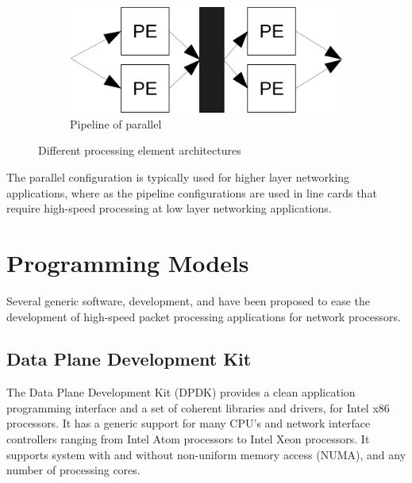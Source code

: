 \begin{figure}
  \begin{subfigure}[b]{0.475\textwidth}
    \centering
    \includegraphics[scale=.5]{images/pipeline-parallel.pdf}
    \caption[]%
    {{\small Pipeline of parallel}}
    \label{fig:pipeline-parallel}
  \end{subfigure}
  \caption[]
  {\small Different processing element architectures}
  \label{fig:processing-element-organization}
\end{figure}

The parallel configuration is typically used for higher layer networking applications, where as the pipeline configurations are used in line cards that require high-speed processing at low layer networking applications.

\section{Programming Models}


Several generic software, development, and have been proposed to ease the development of high-speed packet processing applications for network processors.


\subsection{Data Plane Development Kit}
The Data Plane Development Kit (DPDK) provides a clean application programming interface and a set of coherent libraries and drivers, for Intel x86 processors. It has a generic support for many CPU's and network interface controllers ranging from Intel Atom processors to Intel Xeon processors. It supports system with and without non-uniform memory access (NUMA), and any number of processing cores.~\cite{Intel:DPDK:Doc}

